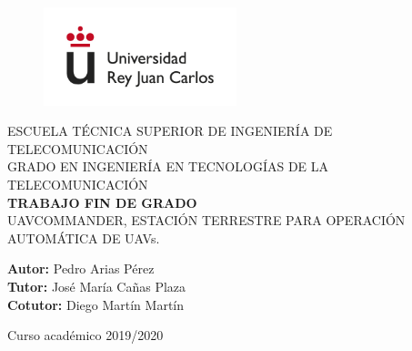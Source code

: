 \begin{figure}[t]
    \centering\includegraphics[width=0.5\textwidth]{figures/urjc_logo_letters.jpg}
\end{figure}

\begin{center}
    \textsc{ \Large{ESCUELA TÉCNICA SUPERIOR DE INGENIERÍA DE TELECOMUNICACIÓN \\}}
    \vspace{10mm}
	\textnormal{ \Large{GRADO EN INGENIERÍA  EN TECNOLOGÍAS DE LA TELECOMUNICACIÓN\\}}
	\vspace{25mm}
    \textup{\LARGE{\textbf{TRABAJO FIN DE GRADO}}} \\
    
    \vspace{25mm}
    \textnormal{ \Large{UAVCOMMANDER, ESTACIÓN TERRESTRE PARA OPERACIÓN AUTOMÁTICA DE UAVs.}}
\end{center}

\vspace{30mm}

\begin{center}
    \textnormal{\normalsize{\textbf{Autor:} Pedro Arias Pérez \\}}
    \textnormal{\normalsize{\textbf{Tutor:} José María Cañas Plaza \\}}
    \textnormal{\normalsize{\textbf{Cotutor:} Diego Martín Martín \\}}
\end{center}

\vspace{20mm}

\begin{center}
   \normalsize{Curso académico 2019/2020} 
\end{center}
